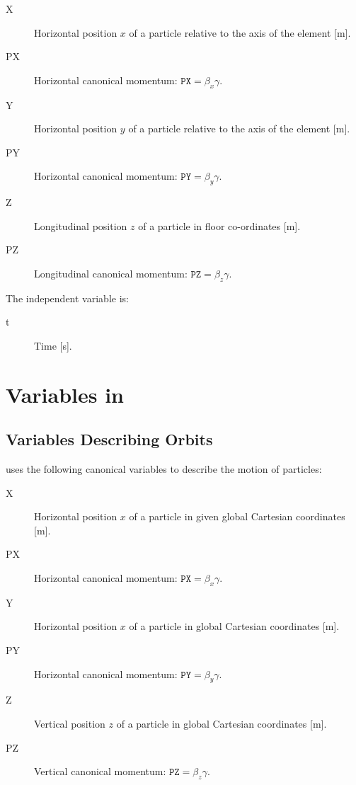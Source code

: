 \begin{description}
\item[X]
  Horizontal position $x$ of a particle relative to the axis of the element [m].

\item[PX]
  Horizontal canonical momentum:
  $\mathtt{PX} = \beta_x \gamma$.

\item[Y]
  Horizontal position $y$ of a particle relative to the axis of the element [m].

\item[PY]
  Horizontal canonical momentum:
  $\mathtt{PY} = \beta_y \gamma$.

\item[Z]
  Longitudinal position $z$ of a particle in floor co-ordinates [m].

\item[PZ]
 Longitudinal canonical momentum: 
 $\mathtt{PZ} = \beta_z \gamma$.

 \end{description}

The independent variable is:
\begin{description}
\item[t]
  Time [s].
\end{description}

\section{Variables in \opalcycl}
\label{sec:variablesopalcycl}

\subsection{Variables Describing Orbits}
\label{sec:canon}

\opalcycl uses the following canonical variables to describe the motion of particles:

\begin{description}
\item[X]
  Horizontal position $x$ of a particle in given global Cartesian coordinates [m].

\item[PX]
  Horizontal canonical momentum:
  $\mathtt{PX} = \beta_x \gamma$.

\item[Y]
  Horizontal position $x$ of a particle in global Cartesian coordinates [m].

\item[PY]
  Horizontal canonical momentum:
  $\mathtt{PY} = \beta_y \gamma$.

\item[Z]
  Vertical position $z$ of a particle in global Cartesian coordinates [m].

\item[PZ]
  Vertical canonical momentum:
  $\mathtt{PZ} = \beta_z \gamma$.

\end{description}

